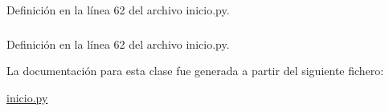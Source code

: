 Definición en la línea 62 del archivo inicio.py.

\hypertarget{classinicio_1_1prueba__adqui_aafd8544e61c02137d45d1202e4330da5}{
\subsubsection[{valores\_\-f}]{}}
\label{classinicio_1_1prueba__adqui_aafd8544e61c02137d45d1202e4330da5}


Definición en la línea 62 del archivo inicio.py.



La documentación para esta clase fue generada a partir del siguiente fichero:\begin{DoxyCompactItemize}
\item 
\hyperlink{inicio_8py}{inicio.py}\end{DoxyCompactItemize}
